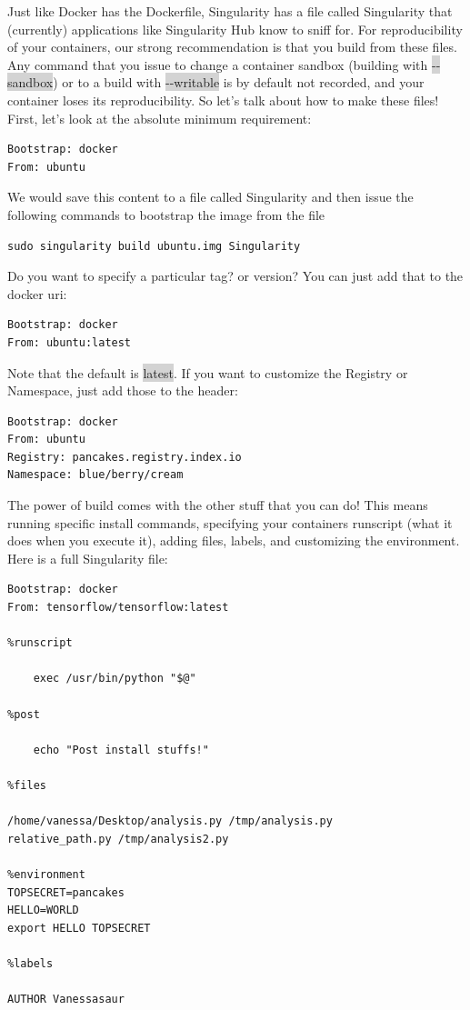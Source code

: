 \documentclass[a4paper]{article}
\begin{document}
Just like Docker has the Dockerfile, Singularity has a file called Singularity that (currently) applications like Singularity Hub know to sniff for. For reproducibility of your containers, our strong recommendation is that you build from these files. Any command that you issue to change a container sandbox (building with \colorbox{lightgray}{-{}-sandbox}) or to a build with \colorbox{lightgray}{-{}-writable} is by default not recorded, and your container loses its reproducibility. So let’s talk about how to make these files! First, let’s look at the absolute minimum requirement:

\begin{lstlisting}[frame=single]  
Bootstrap: docker
From: ubuntu
\end{lstlisting}

We would save this content to a file called Singularity and then issue the following commands to bootstrap the image from the file 

\begin{lstlisting}[frame=single] 
sudo singularity build ubuntu.img Singularity
\end{lstlisting}

Do you want to specify a particular tag? or version? You can just add that to the docker uri:

\begin{lstlisting}[frame=single] 
Bootstrap: docker
From: ubuntu:latest 
\end{lstlisting}

Note that the default is \colorbox{lightgray}{latest}. If you want to customize the Registry or Namespace, just add those to the header:

\begin{lstlisting}[frame=single] 
Bootstrap: docker
From: ubuntu
Registry: pancakes.registry.index.io
Namespace: blue/berry/cream
\end{lstlisting}

The power of build comes with the other stuff that you can do! This means running specific install commands, specifying your containers runscript (what it does when you execute it), adding files, labels, and customizing the environment. Here is a full Singularity file:

\begin{lstlisting}[frame=single] 
Bootstrap: docker
From: tensorflow/tensorflow:latest

%runscript
 
    exec /usr/bin/python "$@"

%post

    echo "Post install stuffs!"

%files

/home/vanessa/Desktop/analysis.py /tmp/analysis.py
relative_path.py /tmp/analysis2.py

%environment
TOPSECRET=pancakes
HELLO=WORLD
export HELLO TOPSECRET

%labels

AUTHOR Vanessasaur 
\end{lstlisting}
\end{document}
